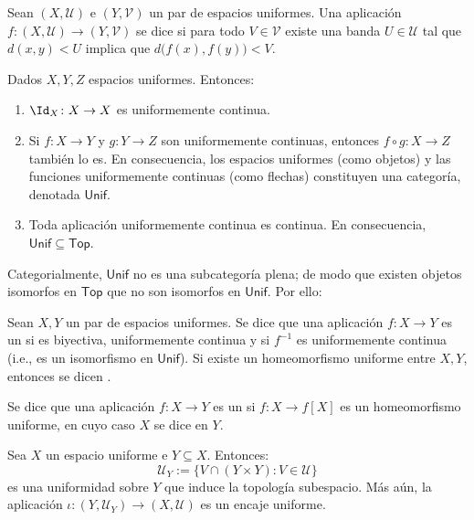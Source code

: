 \documentclass[topologia-analisis.tex]{subfiles}
\begin{document}
\begin{mydefi}
	Sean $(X, \mathcal{U})$ e $(Y, \mathcal{V})$ un par de espacios uniformes.
	Una aplicación $f\colon (X, \mathcal{U}) \to (Y, \mathcal{V})$ se dice 
	si para todo $V \in \mathcal{V}$ existe una banda $U \in \mathcal{U}$ tal que $d(x, y) < U$ implica que $d\big( f(x), f(y) \big) < V$.
\end{mydefi}
\begin{prop}
	Dados $X, Y, Z$ espacios uniformes. Entonces:
	\begin{enumerate}
		\item $\Id_X \colon X \to X$ es uniformemente continua.
		\item Si $f \colon X \to Y$ y $g\colon Y \to Z$ son uniformemente continuas, entonces $f\circ g \colon X \to Z$ también lo es.
			En consecuencia, los espacios uniformes (como objetos) y las funciones uniformemente continuas (como flechas) constituyen
			una categoría, denotada $\mathsf{Unif}$.
		\item Toda aplicación uniformemente continua es continua.
			En consecuencia, $\mathsf{Unif} \subseteq \mathsf{Top}$.
	\end{enumerate}
\end{prop}
Categorialmente, $\mathsf{Unif}$ no es una subcategoría plena; de modo que existen objetos isomorfos en $\mathsf{Top}$ que no son isomorfos en $\mathsf{Unif}$.
Por ello:
\begin{mydef}
	Sean $X, Y$ un par de espacios uniformes.
	Se dice que una aplicación $f\colon X \to Y$ es un  si es biyectiva, uniformemente continua
	y si $f^{-1}$ es uniformemente continua (i.e., es un isomorfismo en $\mathsf{Unif}$).
	Si existe un homeomorfismo uniforme entre $X, Y$, entonces se dicen .
	\par
	Se dice que una aplicación $f\colon X \to Y$ es un  si $f\colon X \to f[X]$ es un homeomorfismo uniforme,
	en cuyo caso $X$ se dice  en $Y$.
\end{mydef}

\begin{thm}
	Sea $X$ un espacio uniforme e $Y \subseteq X$. Entonces:
	$$ \mathcal{U}_Y := \{ V \cap (Y\times Y) : V \in \mathcal{U} \} $$
	es una uniformidad sobre $Y$ que induce la topología subespacio.
	Más aún, la aplicación $\iota\colon (Y, \mathcal{U}_Y) \to (X, \mathcal{U})$ es un encaje uniforme.
\end{thm}
\end{document}
